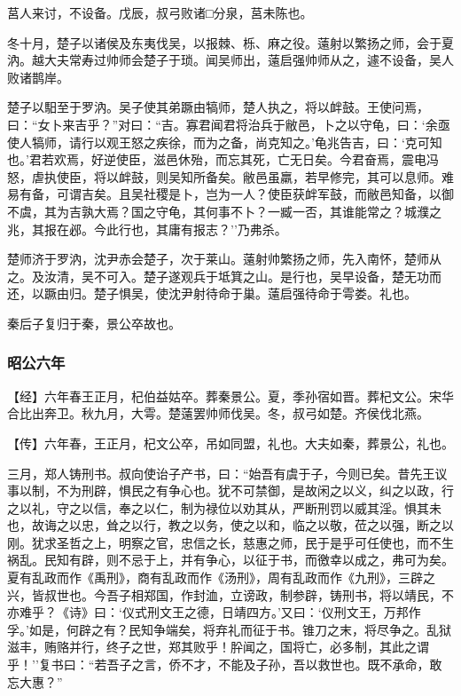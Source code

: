 \documentclass[]{article}
\begin{document}
莒人来讨，不设备。戊辰，叔弓败诸□分泉，莒未陈也。

冬十月，楚子以诸侯及东夷伐吴，以报棘、栎、麻之役。薳射以繁扬之师，会于夏汭。越大夫常寿过帅师会楚子于琐。闻吴师出，薳启强帅师从之，遽不设备，吴人败诸鹊岸。

楚子以馹至于罗汭。吴子使其弟蹶由犒师，楚人执之，将以衅鼓。王使问焉，曰：``女卜来吉乎？''对曰：``吉。寡君闻君将治兵于敝邑，卜之以守龟，曰：`余亟使人犒师，请行以观王怒之疾徐，而为之备，尚克知之。'龟兆告吉，曰：`克可知也。'君若欢焉，好逆使臣，滋邑休殆，而忘其死，亡无日矣。今君奋焉，震电冯怒，虐执使臣，将以衅鼓，则吴知所备矣。敝邑虽羸，若早修完，其可以息师。难易有备，可谓吉矣。且吴社稷是卜，岂为一人？使臣获衅军鼓，而敝邑知备，以御不虞，其为吉孰大焉？国之守龟，其何事不卜？一臧一否，其谁能常之？城濮之兆，其报在邲。今此行也，其庸有报志？''乃弗杀。

楚师济于罗汭，沈尹赤会楚子，次于莱山。薳射帅繁扬之师，先入南怀，楚师从之。及汝清，吴不可入。楚子遂观兵于坻箕之山。是行也，吴早设备，楚无功而还，以蹶由归。楚子惧吴，使沈尹射待命于巢。薳启强待命于雩娄。礼也。

秦后子复归于秦，景公卒故也。

\hypertarget{header-n2464}{%
\subsubsection{昭公六年}\label{header-n2464}}

【经】六年春王正月，杞伯益姑卒。葬秦景公。夏，季孙宿如晋。葬杞文公。宋华合比出奔卫。秋九月，大雩。楚薳罢帅师伐吴。冬，叔弓如楚。齐侯伐北燕。

【传】六年春，王正月，杞文公卒，吊如同盟，礼也。大夫如秦，葬景公，礼也。

三月，郑人铸刑书。叔向使诒子产书，曰：``始吾有虞于子，今则已矣。昔先王议事以制，不为刑辟，惧民之有争心也。犹不可禁御，是故闲之以义，纠之以政，行之以礼，守之以信，奉之以仁，制为禄位以劝其从，严断刑罚以威其淫。惧其未也，故诲之以忠，耸之以行，教之以务，使之以和，临之以敬，莅之以强，断之以刚。犹求圣哲之上，明察之官，忠信之长，慈惠之师，民于是乎可任使也，而不生祸乱。民知有辟，则不忌于上，并有争心，以征于书，而徼幸以成之，弗可为矣。夏有乱政而作《禹刑》，商有乱政而作《汤刑》，周有乱政而作《九刑》，三辟之兴，皆叔世也。今吾子相郑国，作封洫，立谤政，制参辟，铸刑书，将以靖民，不亦难乎？《诗》曰：`仪式刑文王之德，日靖四方。'又曰：`仪刑文王，万邦作孚。'如是，何辟之有？民知争端矣，将弃礼而征于书。锥刀之末，将尽争之。乱狱滋丰，贿赂并行，终子之世，郑其败乎！肸闻之，国将亡，必多制，其此之谓乎！''复书曰：``若吾子之言，侨不才，不能及子孙，吾以救世也。既不承命，敢忘大惠？''
\end{document}
